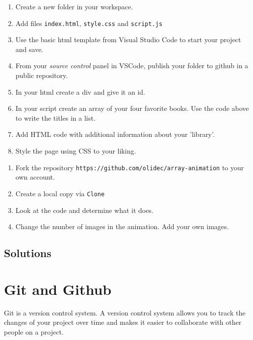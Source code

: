 \documentclass[11pt,a4paper]{report}
\begin{document}
\begin{ex}
\begin{enumerate}
\item Create a new folder in your workspace.
\item Add files \verb|index.html|, \verb|style.css| and \verb|script.js|
\item Use the basic html template from Visual Studio Code to start your project and save.
\item From your \emph{source control} panel in VSCode, publish your folder to github in a public repository.
\item In your html create a div and give it an id.
\item In your script create an array of your four favorite books. Use the code above to write the titles in a list.
\item Add HTML code with additional information about your 'library'.
\item Style the page using CSS to your liking.
\end{enumerate}
\end{ex}

\begin{ex}
\begin{enumerate}
\item Fork the repository \verb|https://github.com/olidec/array-animation| to your own account.
\item Create a local copy via \verb|Clone|
\item Look at the code and determine what it does.
\item Change the number of images in the animation. Add your own images.
\end{enumerate}
\end{ex}



\newpage


\subsection{Solutions}
\printcursols

\newpage



\newpage

\section{Git and Github}

Git is a version control system.  A version control system allows you to track the changes of your project over time and makes it easier to collaborate with other people on a project.
\end{document}

